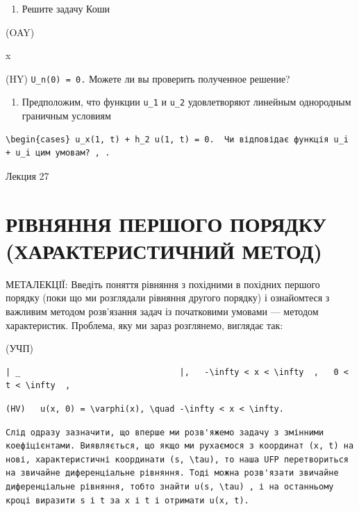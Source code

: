 \documentclass[
  ukrainian,
]{article}
\providecommand{\tightlist}{%
  \setlength{\itemsep}{0pt}\setlength{\parskip}{0pt}}
\begin{document}
\begin{enumerate}
\def\labelenumi{\arabic{enumi}.}
\setcounter{enumi}{4}
\tightlist
\item
  Решите задачу Коши
\end{enumerate}

(OAY)

x

(HY) \texttt{U\_n(0)\ =\ 0.} Можете ли вы проверить полученное решение?

\begin{enumerate}
\def\labelenumi{\arabic{enumi}.}
\setcounter{enumi}{5}
\tightlist
\item
  Предположим, что функции \texttt{u\_1} и \texttt{u\_2} удовлетворяют
  линейным однородным граничным условиям
\end{enumerate}

\begin{verbatim}
\begin{cases} u_x(1, t) + h_2 u(1, t) = 0.  Чи відповідає функція u_i + u_i цим умовам? , .
\end{verbatim}

Лекция 27

\section{РІВНЯННЯ ПЕРШОГО ПОРЯДКУ (ХАРАКТЕРИСТИЧНИЙ
МЕТОД)}\label{ux440ux456ux432ux43dux44fux43dux43dux44f-ux43fux435ux440ux448ux43eux433ux43e-ux43fux43eux440ux44fux434ux43aux443-ux445ux430ux440ux430ux43aux442ux435ux440ux438ux441ux442ux438ux447ux43dux438ux439-ux43cux435ux442ux43eux434}

МЕТАЛЕКЦІЇ: Введіть поняття рівняння з похідними в похідних першого
порядку (поки що ми розглядали рівняння другого порядку) і ознайомтеся з
важливим методом розв'язання задач із початковими умовами --- методом
характеристик. Проблема, яку ми зараз розглянемо, виглядає так:

(УЧП)

\begin{verbatim}
| _                                |,   -\infty < x < \infty  ,   0 < t < \infty  ,
\end{verbatim}

\begin{verbatim}
(HV)   u(x, 0) = \varphi(x), \quad -\infty < x < \infty.
\end{verbatim}

\begin{verbatim}
Слід одразу зазначити, що вперше ми розв'яжемо задачу з змінними коефіцієнтами. Виявляється, що якщо ми рухаємося з координат (x, t) на нові, характеристичні координати (s, \tau), то наша UFP перетвориться на звичайне диференціальне рівняння. Тоді можна розв'язати звичайне диференціальне рівняння, тобто знайти u(s, \tau) , і на останньому кроці виразити s і t за x і t і отримати u(x, t).
\end{verbatim}
\end{document}
